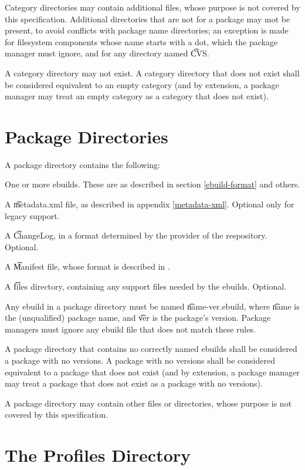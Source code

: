 Category directories may contain additional files, whose purpose is not covered by this
specification. Additional directories that are not for a package may \i{not} be present, to avoid
conflicts with package name directories; an exception is made for filesystem components whose name
starts with a dot, which the package manager must ignore, and for any directory named \t{CVS}.

A category directory may not exist. A category directory that does not exist shall be considered
equivalent to an empty category (and by extension, a package manager may treat an empty category as
a category that does not exist).

\section{Package Directories}
\label{package-dirs}

A package directory contains the following:
\begin{compactitem}
\item One or more ebuilds. These are as described in section \ref{ebuild-format} and others.
\item A \t{metadata.xml} file, as described in appendix \ref{metadata-xml}\@. Optional only for
    legacy support.
\item A \t{ChangeLog}, in a format determined by the provider of the respository. Optional.
\item A \t{Manifest} file, whose format is described in \cite{Glep44}.
\item A \t{files} directory, containing any support files needed by the ebuilds. Optional.
\end{compactitem}

Any ebuild in a package directory must be named \t{name-ver.ebuild}, where \t{name} is the
(unqualified) package name, and \t{ver} is the package's version. Package managers must ignore
any ebuild file that does not match these rules.

A package directory that contains no correctly named ebuilds shall be considered a package with no
versions. A package with no versions shall be considered equivalent to a package that does not
exist (and by extension, a package manager may treat a package that does not exist as a package
with no versions).

A package directory may contain other files or directories, whose purpose is not covered by
this specification.

\section{The Profiles Directory}
\label{profiles-dir}


